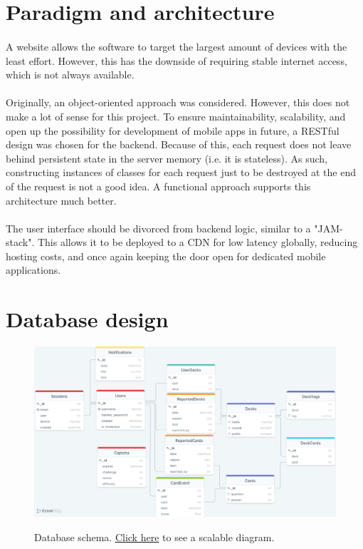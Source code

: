\documentclass{report}
\begin{document}
\section{Paradigm and architecture}
\paragraph{}
A website allows the software to target the largest amount of devices with the least effort. However, this has the downside of requiring stable internet access, which is not always available.

\paragraph{}
Originally, an object-oriented approach was considered. However, this does not make a lot of sense for this project. To ensure maintainability, scalability, and open up the possibility for development of mobile apps in future, a RESTful design was chosen for the backend. Because of this, each request does not leave behind persistent state in the server memory (i.e. it is stateless). As such, constructing instances of classes for each request just to be destroyed at the end of the request is not a good idea. A functional approach supports this architecture much better.

\paragraph{}
The user interface should be divorced from backend logic, similar to a "JAM-stack". This allows it to be deployed to a CDN for low latency globally, reducing hosting costs, and once again keeping the door open for dedicated mobile applications.

\section{Database design}

\begin{figure}[h!]
  \includegraphics[width=\linewidth]{./media/db_schema.png}
  \label{fig:database1}
  \caption{Database schema. \href{https://drawsql.app/--347/diagrams/iroase}{Click here} to see a scalable diagram.}
\end{figure}
\end{document}
